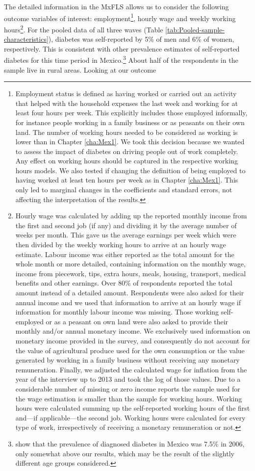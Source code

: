 The detailed information in the \ac{MxFLS} allows us to consider the following outcome variables of interest: employment\footnote{Employment status is defined as having worked or carried out an activity that helped with the household expenses the last week and working for at least four hours per week. This explicitly includes those employed informally, for instance people working in a family business or as peasants on their own land. The number of working hours needed to be considered as working is lower than in Chapter \ref{cha:Mex1}. We took this decision because we wanted to assess the impact of diabetes on driving people out of work completely. Any effect on working hours should be captured in the respective working hours models. We also tested if changing the definition of being employed to having worked at least ten hours per week as in Chapter \ref{cha:Mex1}. This only led to marginal changes in the coefficients and standard errors, not affecting the interpretation of the results.}, hourly wage and weekly working hours\footnote{Hourly wage was calculated by adding up the reported monthly income from the first and second job (if any) and dividing it by the average number of weeks per month. This gave us the average earnings per week which were then divided by the weekly working hours to arrive at an hourly wage estimate. Labour income was either reported as the total amount for the whole month or more detailed, containing information on the monthly wage, income from piecework, tips, extra hours, meals, housing, transport, medical benefits and other earnings. Over 80\% of respondents reported the total amount instead of a detailed amount. Respondents were also asked for their annual income and we used that information to arrive at an hourly wage if information for monthly labour income was missing. Those working self-employed or as a peasant on own land were also asked to provide their monthly and/or annual monetary income. We exclusively used information on monetary income provided in the survey, and consequently do not account for the value of agricultural produce used for the own consumption or the value generated by working in a family business without receiving any monetary remuneration.  Finally, we adjusted the calculated wage for inflation from the year of the interview up to 2013 and took the log of those values. Due to a considerable number of missing or zero income reports the sample used for the wage estimation is smaller than the sample for working hours. Working hours were calculated summing up the self-reported working hours of the first and---if applicable---the second job. Working hours were calculated for every type of work, irrespectively of receiving a monetary remuneration or not.}. For the pooled data of all three waves (Table  \ref{tab:Pooled-sample-characteristics}), diabetes was self-reported by 5\% of men and 6\% of women, respectively. This is consistent with other prevalence estimates of self-reported diabetes for this time period in Mexico.\footnote{\textcite{Barquera2013} show that the prevalence of diagnosed diabetes in Mexico was 7.5\% in 2006, only somewhat above our results, which may be the result of the slightly different age groups considered.}  About half of the respondents in the sample live in rural areas. Looking at our outcome 